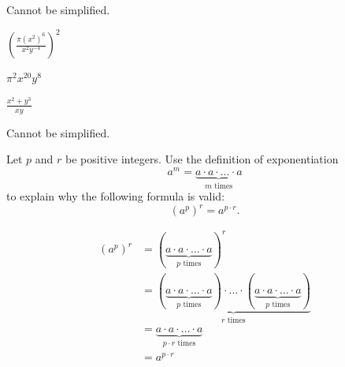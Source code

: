 \begin{solution}
Cannot be simplified.
\end{solution}

\begin{exercise}
$\displaystyle \left(\frac{\pi (x^{2})^6}{x^{2}y^{-4}}\right)^2$
\end{exercise}

\begin{solution}
$\pi^2x^{20}y^8$
\end{solution}

\begin{exercise}\label{exercise-4.1.15}
$\displaystyle \frac{x^2+y^3}{xy}$
\end{exercise}

\begin{solution}
Cannot be simplified.
\end{solution}





\begin{exercise}
Let $p$ and $r$ be positive integers. Use the definition of exponentiation
\[
a^m=\underbrace{a\cdot a\cdot  \ldots \cdot a}_{m \text{ times}}
\]
to explain why the following formula is valid:
\[
(a^p)^r=a^{p\cdot r}
.\]
\end{exercise}

\begin{solution}
\begin{align*}
(a^p)^r & = \left( \underbrace{a \cdot a \cdot \ldots \cdot a}_{p \text{ times}}\right)^r \\
& = \underbrace{\left( \underbrace{a \cdot a \cdot \ldots \cdot a}_{p \text{ times}}\right) \cdot \ldots \cdot \left( \underbrace{a \cdot a \cdot \ldots \cdot a}_{p \text{ times}}\right)}_{r \text{ times}} \\
&= \underbrace{a \cdot a \cdot \ldots \cdot a}_{p \cdot r \text{ times}} \\
&= a^{p\cdot r}
\end{align*}
\end{solution}
